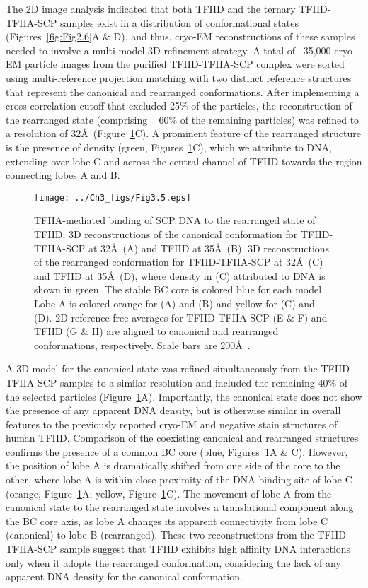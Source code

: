 The 2D image analysis indicated that both TFIID and the ternary TFIID-TFIIA-SCP samples exist in a distribution of conformational states (Figures~\ref{fig:Fig2.6}A \& D), and thus, cryo-EM reconstructions of these samples needed to involve a multi-model 3D refinement strategy. A total of ~35,000 cryo-EM particle images from the purified TFIID-TFIIA-SCP complex were sorted using multi-reference projection matching with two distinct reference structures that represent the canonical and rearranged conformations. After implementing a cross-correlation cutoff that excluded 25\% of the particles, the reconstruction of the rearranged state (comprising ~ 60\% of the remaining particles) was refined to a resolution of 32\AA\ (Figure~\ref{fig:Fig3.5}C). A prominent feature of the rearranged structure is the presence of density (green, Figures~\ref{fig:Fig3.5}C), which we attribute to DNA, extending over lobe C and across the central channel of TFIID towards the region connecting lobes A and B. \\
\begin{figure}
\centering
\texttt{[image: ../Ch3\_figs/Fig3.5.eps]}
\caption[TFIIA-mediated binding of SCP DNA to the rearranged state of TFIID]{TFIIA-mediated binding of SCP DNA to the rearranged state of TFIID. 3D reconstructions of the canonical conformation for TFIID-TFIIA-SCP at 32\AA\ (A) and TFIID at 35\AA\ (B).  3D reconstructions of the rearranged conformation for TFIID-TFIIA-SCP at 32\AA\ (C) and TFIID at 35\AA\ (D), where density in (C) attributed to DNA is shown in green. The stable BC core is colored blue for each model. Lobe A is colored orange for (A) and (B) and yellow for (C) and (D). 2D reference-free averages for TFIID-TFIIA-SCP (E \& F) and TFIID (G \& H) are aligned to canonical and rearranged conformations, respectively. Scale bars are 200\AA\ .}
\label{fig:Fig3.5}
\end{figure}
\indent A 3D model for the canonical state was refined simultaneously from the TFIID-TFIIA-SCP samples to a similar resolution and included the remaining 40\% of the selected particles (Figure~\ref{fig:Fig3.5}A). Importantly, the canonical state does not show the presence of any apparent DNA density, but is otherwise similar in overall features to the previously reported cryo-EM \cite{Grob_1281} and negative stain \cite{Liu_574} structures of human TFIID. Comparison of the coexisting canonical and rearranged structures confirms the presence of a common BC core (blue, Figures~\ref{fig:Fig3.5}A \& C). However, the position of lobe A is dramatically shifted from one side of the core to the other, where lobe A is within close proximity of the DNA binding site of lobe C (orange, Figure~\ref{fig:Fig3.5}A; yellow, Figure~\ref{fig:Fig3.5}C). The movement of lobe A from the canonical state to the rearranged state involves a translational component along the BC core axis, as lobe A changes its apparent connectivity from lobe C (canonical) to lobe B (rearranged). These two reconstructions from the TFIID-TFIIA-SCP sample suggest that TFIID exhibits high affinity DNA interactions only when it adopts the rearranged conformation, considering the lack of any apparent DNA density for the canonical conformation.\\
